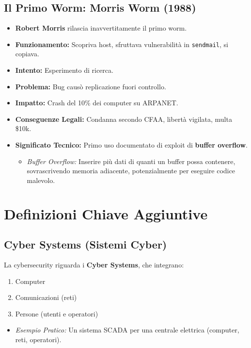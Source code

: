 \documentclass{article}
\begin{document}
\subsection{Il Primo Worm: Morris Worm (1988)}
\begin{itemize}
    \item \textbf{Robert Morris} rilascia inavvertitamente il primo worm.
    \item \textbf{Funzionamento:} Scopriva host, sfruttava vulnerabilità in \texttt{sendmail}, si copiava.
    \item \textbf{Intento:} Esperimento di ricerca.
    \item \textbf{Problema:} Bug causò replicazione fuori controllo.
    \item \textbf{Impatto:} Crash del 10\% dei computer su ARPANET.
    \item \textbf{Conseguenze Legali:} Condanna secondo CFAA, libertà vigilata, multa \$10k.
    \item \textbf{Significato Tecnico:} Primo uso documentato di exploit di \textbf{buffer overflow}.
    \begin{itemize}
        \item \textit{Buffer Overflow:} Inserire più dati di quanti un buffer possa contenere, sovrascrivendo memoria adiacente, potenzialmente per eseguire codice malevolo.
    \end{itemize}
\end{itemize}

\section{Definizioni Chiave Aggiuntive}

\subsection{Cyber Systems (Sistemi Cyber)}
La cybersecurity riguarda i \textbf{Cyber Systems}, che integrano:
\begin{enumerate}
    \item Computer
    \item Comunicazioni (reti)
    \item Persone (utenti e operatori)
\end{enumerate}
\begin{itemize}
    \item \textit{Esempio Pratico:} Un sistema SCADA per una centrale elettrica (computer, reti, operatori).
\end{itemize}
\end{document}
